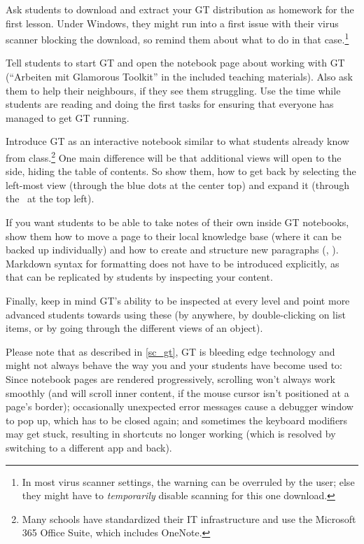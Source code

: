 \begin{instructions}
\item Ask students to download and extract your \ac{GT} distribution as homework for the first lesson. Under Windows, they might run into a first issue with their virus scanner blocking the download, so remind them about what to do in that case.\footnote{In most virus scanner settings, the warning can be overruled by the user; else they might have to \emph{temporarily} disable scanning for this one download.}
\item Tell students to start \ac{GT} and open the notebook page about working with \ac{GT} (``Arbeiten mit Glamorous Toolkit'' in the included teaching materials). Also ask them to help their neighbours, if they see them struggling. Use the time while students are reading and doing the first tasks for ensuring that everyone has managed to get \ac{GT} running.
\item Introduce \ac{GT} as an interactive notebook similar to what students already know from class.\footnote{Many schools have standardized their IT infrastructure and use the Microsoft 365 Office Suite, which includes OneNote.} One main difference will be that additional views will open to the side, hiding the table of contents. So show them, how to get back by selecting the left-most view (through the blue dots at the center top) and expand it (through the \faPlusCircle\ at the top left).
\item If you want students to be able to take notes of their own inside \ac{GT} notebooks, show them how to move a page to their local knowledge base (where it can be backed up individually) and how to create and structure new paragraphs (, ). Markdown syntax for formatting does not have to be introduced explicitly, as that can be replicated by students by inspecting your content.
\item Finally, keep in mind \ac{GT}'s ability to be inspected at every level and point more advanced students towards using these (\eg by  anywhere, by double-clicking on list items, or by going through the different views of an object).
\end{instructions}

Please note that as described in \ref{sc_gt}, \ac{GT} is bleeding edge technology and might not always behave the way you and your students have become used to: Since notebook pages are rendered progressively, scrolling won't always work smoothly (and will scroll inner content, if the mouse cursor isn't positioned at a page's border); occasionally unexpected error messages cause a debugger window to pop up, which has to be closed again; and sometimes the keyboard modifiers may get stuck, resulting in shortcuts no longer working (which is resolved by switching to a different app and back).


